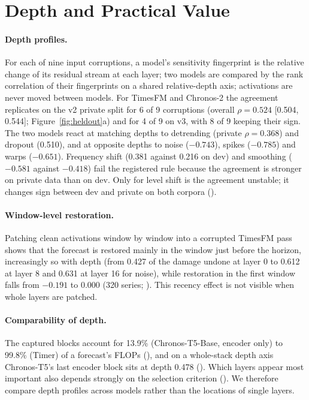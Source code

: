 \section{Depth and Practical Value}
\label{sec:depth}

\paragraph{Depth profiles.} For each of nine input corruptions, a model's sensitivity
fingerprint is the relative change of its residual stream at each layer; two models are compared by the rank
correlation of their fingerprints on a shared relative-depth axis; activations are never moved between models. For
TimesFM and Chronos-2 the agreement replicates on the v2 private split for 6 of 9 corruptions (overall $\rho=0.524$
[0.504, 0.544]; Figure~\ref{fig:heldout}a) and for 4 of 9 on v3, with 8 of 9 keeping their sign. The two models react at
matching depths to detrending (private $\rho=0.368$) and dropout (0.510), and at opposite depths to noise ($-0.743$),
spikes ($-0.785$) and warps ($-0.651$). Frequency shift (0.381 against 0.216 on dev) and smoothing ($-0.581$ against
$-0.418$) fail the registered rule because the agreement is stronger on private data than on dev. Only for level shift
is the agreement unstable; it changes sign between dev and private on both corpora ().

\paragraph{Window-level restoration.} Patching clean activations window by window into a
corrupted TimesFM pass shows that the forecast is restored mainly in the window just before the horizon, increasingly so with
depth (from 0.427 of the damage undone at layer 0 to 0.612 at layer 8 and 0.631 at layer 16 for noise), while restoration
in the first window falls from $-0.191$ to 0.000 (320 series; ). This recency effect is
not visible when whole layers are patched.

\paragraph{Comparability of depth.} The captured blocks account for 13.9\%
(Chronos-T5-Base, encoder only) to 99.8\% (Timer) of a forecast's FLOPs (), and on a whole-stack depth axis
Chronos-T5's last encoder block sits at depth 0.478 (). Which layers appear most important also depends
strongly on the selection criterion (). We therefore compare depth profiles across models rather than
the locations of single layers.

